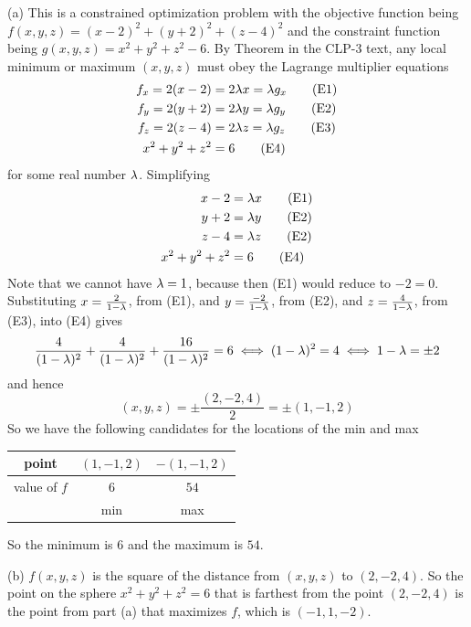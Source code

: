 \begin{solution}
(a)
This is a constrained optimization problem with the objective function being
$f(x,y,z) = (x - 2)^2 + (y + 2)^2 + (z - 4)^2$ and the constraint function 
being $g(x,y,z) =x^2 + y^2 + z^2 - 6$.
By Theorem  in the CLP-3 text, any local minimum
or maximum $(x,y,z)$ must obey the  Lagrange multiplier equations
\begin{align*}
f_x = 2(x-2) &=2 \lambda x = \lambda g_x \tag{E1} \\ 
f_y = 2(y+2) &=2 \lambda y = \lambda g_y \tag{E2} \\ 
f_z = 2(z-4) &=2 \lambda z = \lambda g_z \tag{E3} \\ 
x^2 + y^2 + z^2 &= 6 \tag{E4}
\end{align*}
for some real number $\lambda$.
Simplifying
\begin{align*}
x-2 &= \lambda x  \tag{E1} \\ 
y+2 &= \lambda y \tag{E2} \\ 
z-4 &= \lambda z \tag{E2} \\
x^2 + y^2 + z^2 &= 6 \tag{E4}
\end{align*}
Note that we cannot have $\lambda=1$, because then (E1) would reduce to $-2=0$.
Substituting 
  $x=\frac{2}{1-\lambda}$, from (E1), and
  $y=\frac{-2}{1-\lambda}$, from (E2), and
  $z=\frac{4}{1-\lambda}$, from (E3), 
into (E4) gives
\begin{align*}
\frac{4}{(1-\lambda)^2} + \frac{4}{(1-\lambda)^2} + \frac{16}{(1-\lambda)^2} =6
\iff (1-\lambda)^2=4
\iff 1-\lambda =\pm 2
\end{align*}
and hence
\begin{equation*}
(x,y,z) = \pm \frac{(2,-2,4)}{2}= \pm (1,-1,2)
\end{equation*}
So we have the following candidates for the locations of the min and max
\begin{center}
\renewcommand{\arraystretch}{1.3}
     \begin{tabular}{|c|c|c|}
     \hline
       point
       &$(1,-1,2)$
       &$-(1,-1,2)$ \\ \hline
       value of $f$
       &$6$
       &$54$ \\ \hline
       &min 
       &max \\ \hline
     \end{tabular}
\renewcommand{\arraystretch}{1.0}
\end{center}
So the minimum is $6$ and the maximum is $54$.

(b) $f(x,y,z)$ is the square of the distance from $(x,y,z)$ to $(2,-2,4)$.
So the point on the sphere $x^2 + y^2 + z^2 = 6$ that is farthest 
from the point $(2, -2, 4)$ is the point from part (a) that maximizes $f$,
which is $(-1,1,-2)$.
\end{solution}

